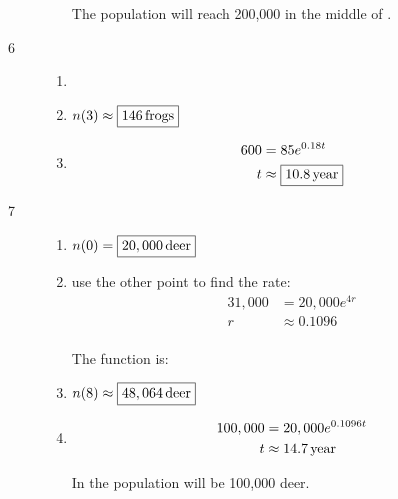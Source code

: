 \documentclass{exam}
\begin{document}
\begin{description}
\begin{enumerate}[a]
            The population will reach 200,000 in the middle of . 

        \end{enumerate}

      \item[6] 
        \begin{enumerate}[a]
          \item {}

          \item $n(3) \approx \boxed{\unit[146]{frogs}}$

          \item 
            \begin{align*}
              600 & = 85 e^{0.18t} \\
              t   & \approx \boxed{\unit[10.8]{year}} \\
            \end{align*}

        \end{enumerate}

      \item[7] 
        \begin{enumerate}[a]
          \item $n(0) = \boxed{\unit[20,000]{deer}}$

          \item use the other point to find the rate:
            \begin{align*}
              31,000 & = 20,000 e^{4r} \\
              r      & \approx 0.1096 \\
            \end{align*}

            The function is: 

          \item $n(8) \approx \boxed{\unit[48,064]{deer}}$

          \item 
            \begin{align*}
              100,000 & = 20,000 e^{0.1096 t} \\
              t       & \approx \unit[14.7]{year} \\
            \end{align*}

            In  the population will be 100,000 deer.

        \end{enumerate}


\end{description}
\end{document}
